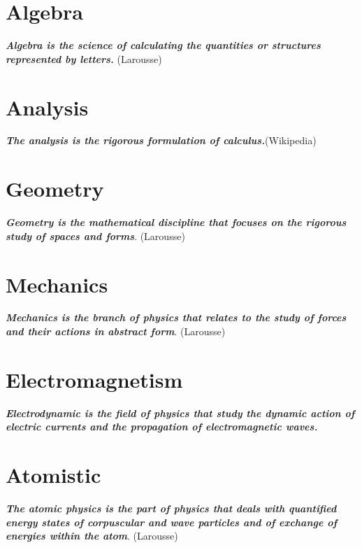 \documentclass[12pt,a4paper,twoside,openright]{report}
\theoremstyle{definition}
\theoremstyle{itexmp}
\numberwithin{equation}{section}
\begin{document}
	
  \chapter{Algebra}

	\textit{\textbf{Algebra is the science of calculating the quantities or structures represented by letters.}} (Larousse)
	\minitoc
	
	
		
 \chapter{Analysis}

	\textit{\textbf{The analysis is the rigorous formulation of calculus.}}(Wikipedia)
	\minitoc
	\pagebreak
	
		
\chapter{Geometry}

	\textit{\textbf{Geometry is the mathematical discipline that focuses on the rigorous study of spaces and forms}}. (Larousse)
	\minitoc
	\pagebreak
	
	
   \chapter{Mechanics}

	\textit{\textbf{Mechanics is the branch of physics that relates to the study of forces and their actions in abstract form}}. (Larousse)
	\minitoc
	
	
\chapter{Electromagnetism}

	\textit{\textbf{Electrodynamic is the field of physics that study the dynamic action of electric currents and the propagation of electromagnetic waves.}}
	\minitoc
	\pagebreak
	

\chapter{Atomistic}

	\textit{\textbf{The atomic physics is the part of physics that deals with quantified energy states of corpuscular and wave particles and of exchange of energies within the atom}}. (Larousse)
	\minitoc
	\pagebreak
	
	
\end{document}
